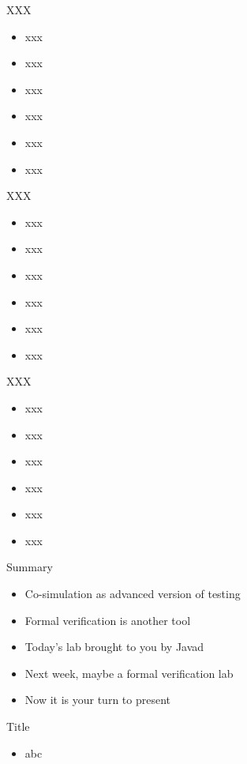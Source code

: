 \begin{frame}[fragile]{XXX}
\begin{itemize}
\item xxx
\item xxx
\item xxx
\item xxx
\item xxx
\item xxx
\end{itemize}
\end{frame}

\begin{frame}[fragile]{XXX}
\begin{itemize}
\item xxx
\item xxx
\item xxx
\item xxx
\item xxx
\item xxx
\end{itemize}
\end{frame}

\begin{frame}[fragile]{XXX}
\begin{itemize}
\item xxx
\item xxx
\item xxx
\item xxx
\item xxx
\item xxx
\end{itemize}
\end{frame}





\begin{frame}[fragile]{Summary}
\begin{itemize}
\item Co-simulation as advanced version of testing
\item Formal verification is another tool
\item Today's lab brought to you by Javad
\item Next week, maybe a formal verification lab
\item Now it is your turn to present
\end{itemize}
\end{frame}




\begin{frame}[fragile]{Title}
\begin{itemize}
\item abc
\end{itemize}
\end{frame}
